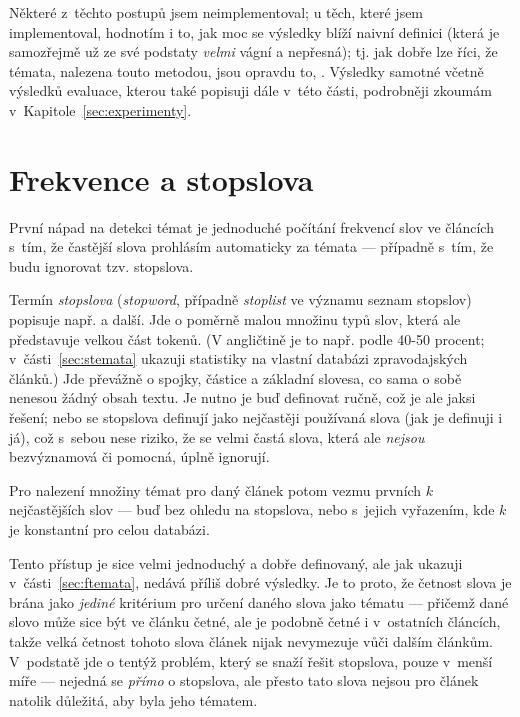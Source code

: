 \documentclass[12pt,a4paper]{report}
\begin{document}
Některé z~těchto postupů jsem neimplementoval; u těch, které jsem implementoval, hodnotím i to, jak moc se výsledky blíží naivní definici (která je samozřejmě už ze své podstaty \emph{velmi} vágní a nepřesná); tj. jak dobře lze říci, že témata, nalezena touto metodou, jsou opravdu to, . Výsledky samotné včetně výsledků evaluace, kterou také popisuji dále v~této části, podrobněji zkoumám v~Kapitole~\ref{sec:experimenty}.

\section{Frekvence a stopslova}
\label{sec:frekvestopslo}

První nápad na detekci témat je jednoduché počítání frekvencí slov ve článcích s~tím, že častější slova prohlásím automaticky za témata --- případně s~tím, že budu ignorovat tzv. stopslova.

Termín \emph{stopslova} (\emph{stopword}, případně \emph{stoplist} ve významu seznam stopslov) popisuje např. \cite{introduction} a další. Jde o po\-mě\-r\-ně ma\-lou mno\-ži\-nu ty\-pů slov, kte\-rá ale před\-sta\-vu\-je vel\-kou část to\-ke\-nů. (V angličtině je to např. po\-dle \cite{introduction} 40-50 pro\-cent; v~části~\ref{sec:stemata} ukazuji statistiky na vlastní databázi zpravodajských článků.) Jde převážně o spojky, částice a zá\-klad\-ní slovesa, co sama o sobě nenesou žádný obsah textu. Je nutno je buď definovat ručně, což je ale jaksi  řešení; nebo se stopslova definují jako nej\-čas\-tě\-ji po\-u\-ží\-va\-ná slo\-va (jak je definuji i já), což s~sebou ne\-se ri\-zi\-ko, že se vel\-mi čas\-tá slo\-va, kte\-rá ale \emph{ne\-jsou} bez\-vý\-zna\-mo\-vá či po\-moc\-ná, ú\-pl\-ně i\-gno\-ru\-jí.

Pro nalezení množiny témat pro daný článek potom vezmu prvních $k$ nej\-ča\-s\-tě\-j\-ších slov --- buď bez ohledu na stopslova, nebo s~jejich vyřazením, kde $k$ je konstantní pro celou databázi.

Tento přístup je sice velmi jednoduchý a dobře definovaný, ale jak ukazuji v~části~\ref{sec:ftemata}, nedává příliš dobré výsledky. Je to proto, že četnost slova je brána jako \emph{jediné} kritérium pro určení daného slova jako tématu --- přičemž dané slovo může sice být ve článku četné, ale je podobně četné i v~ostatních článcích, takže velká četnost tohoto slova článek nijak nevymezuje vůči dalším článkům. V~podstatě jde o tentýž problém, který se snaží řešit stopslova, pouze v~menší míře --- nejedná se \emph{přímo} o stopslova, ale přesto tato slova nejsou pro článek natolik důležitá, aby byla jeho tématem.
\end{document}
